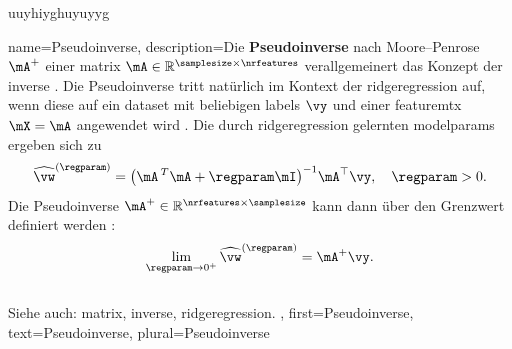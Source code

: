 
uuyhiyghuyuyyg

\makeglossaries


{name={Pseudoinverse},
  description={Die \textbf{Pseudoinverse} nach Moore–Penrose $\mA^{+}$ 
  	einer \gls{matrix} $\mA \in \mathbb{R}^{\samplesize \times \nrfeatures}$ verallgemeinert das Konzept der 
  	\gls{inverse} \cite{GolubVanLoanBook}. Die Pseudoinverse\cite{unikassel} tritt natürlich im Kontext der 
  	\gls{ridgeregression} auf, wenn diese auf ein \gls{dataset} mit beliebigen \glspl{label} $\vy$ 
  	und einer \gls{featuremtx} $\mX = \mA$ angewendet wird \cite[Kap.\ 3]{hastie01statisticallearning}. 
  	Die durch \gls{ridgeregression} gelernten \glspl{modelparam} ergeben sich zu
  	\[
  	\widehat{\vw}^{(\regparam)}  = \big(\mA\,^{T} \mA + \regparam \mI \big)^{-1} \mA^\top \vy, \quad \regparam > 0.
  	\]
  	Die Pseudoinverse $\mA^+ \in \mathbb{R}^{\nrfeatures \times \samplesize}$ kann dann über den Grenzwert definiert werden \cite[Kap. 3]{benisrael2003generalized}:
  	\[
  	\lim_{\regparam \to 0^+} \widehat{\vw}^{(\regparam)} = \mA^+ \vy.
  	\]
  	\\
  	Siehe auch: \gls{matrix}, \gls{inverse}, \gls{ridgeregression}.
  },
 first={Pseudoinverse},
 text={Pseudoinverse}, 
 plural={Pseudoinverse}
}


